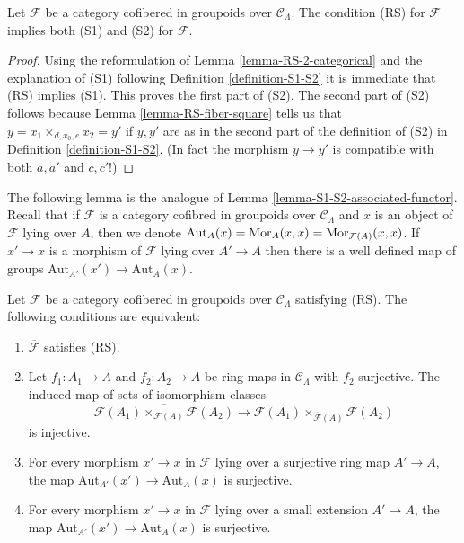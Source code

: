 \begin{lemma}
\label{lemma-RS-implies-S1-S2}
Let $\mathcal{F}$ be a category cofibered in groupoids over
$\mathcal{C}_\Lambda$. The condition (RS) for $\mathcal{F}$
implies both (S1) and (S2) for $\mathcal{F}$.
\end{lemma}

\begin{proof}
Using the reformulation of
Lemma \ref{lemma-RS-2-categorical}
and the explanation of (S1) following
Definition \ref{definition-S1-S2}
it is immediate that (RS) implies (S1).
This proves the first part of (S2). The second part of (S2)
follows because
Lemma \ref{lemma-RS-fiber-square}
tells us that $y = x_1 \times_{d, x_0, e} x_2 = y'$ if
$y, y'$ are as in the second part of the definition of (S2) in
Definition \ref{definition-S1-S2}. (In fact the morphism
$y \to y'$ is compatible with both $a, a'$ and $c, c'$!)
\end{proof}

\noindent
The following lemma is the analogue of
Lemma \ref{lemma-S1-S2-associated-functor}.
Recall that if $\mathcal{F}$ is a category cofibred in groupoids over
$\mathcal{C}_\Lambda$ and $x$ is an object of $\mathcal{F}$
lying over $A$, then we denote
$\text{Aut}_A(x) = \mathop{\mathrm{Mor}}\nolimits_A(x, x) = \mathop{\mathrm{Mor}}\nolimits_{\mathcal{F}(A)}(x, x)$.
If $x' \to x$ is a morphism of $\mathcal{F}$ lying over $A' \to A$
then there is a well defined map of groups
$\text{Aut}_{A'}(x') \to \text{Aut}_A(x)$.

\begin{lemma}
\label{lemma-RS-associated-functor}
Let $\mathcal{F}$ be a category cofibered in groupoids over
$\mathcal{C}_\Lambda$ satisfying (RS).
The following conditions are equivalent:
\begin{enumerate}
\item $\overline{\mathcal{F}}$ satisfies (RS).
\item Let $f_1: A_1 \to A$ and $f_2: A_2 \to A$ be ring maps in
$\mathcal{C}_\Lambda$ with $f_2$ surjective. The induced map
of sets of isomorphism classes
$$
\overline{\mathcal{F}(A_1) \times_{\mathcal{F}(A)} \mathcal{F}(A_2)}
\to \overline{\mathcal{F}}(A_1) \times_{\overline{\mathcal{F}}(A)}
\overline{\mathcal{F}}(A_2)
$$
is injective.
\item For every morphism $x' \to x$ in $\mathcal{F}$ lying over a
surjective ring map $A' \to A$, the map
$\text{Aut}_{A'}(x') \to \text{Aut}_A(x)$ is surjective.
\item For every morphism $x' \to x$ in $\mathcal{F}$ lying over a small
extension $A' \to A$, the map
$\text{Aut}_{A'}(x') \to \text{Aut}_A(x)$ is surjective.
\end{enumerate}
\end{lemma}

